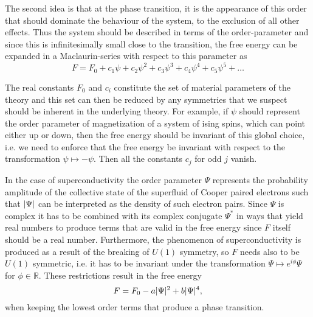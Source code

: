 The second idea is that at the phase transition, it is the appearance of this order that should dominate the behaviour
of the system, to the exclusion of all other effects. Thus the system should be described in terms of the order-parameter
and since this is infinitesimally small close to the transition, the free energy can be expanded in a Maclaurin-series
with respect to this parameter as
\begin{equation}
    \label{eq:statMech:LandauMaclaurin}
    F = F_0 + c_1 \psi + c_2 \psi^2 + c_3 \psi^3 + c_4 \psi^4 + c_5 \psi^5 + \ldots
\end{equation}

The real constants $F_0$ and $c_i$ constitute the set of material parameters of the theory and this set can then
be reduced by any symmetries that we suspect should be inherent in the underlying theory. For example, if $\psi$
should represent the order parameter of magnetization of a system of ising spins, which can point either up or
down, then the free energy should be invariant of this global choice, i.e. we need to enforce that the free energy
be invariant with respect to the transformation $\psi \mapsto -\psi$. Then all the constants $c_j$ for odd $j$
vanish.

In the case of superconductivity the order parameter $\Psi$ represents the probability amplitude of the collective
state of the superfluid of Cooper paired electrons such that $\lvert \Psi \rvert$ can be interpreted as the density of such
electron pairs. Since $\Psi$ is complex it has to be combined with its complex conjugate $\Psi^\ast$ in ways that
yield real numbers to produce terms that are valid in the free energy since $F$ itself should be a real number.
Furthermore, the phenomenon of superconductivity is produced as a result of the breaking of $U(1)$ symmetry, so $F$
needs also to be $U(1)$ symmetric, i.e. it has to be invariant under the transformation $\Psi \mapsto e^{i\phi}\Psi$
for $\phi\in\mathbb{R}$. These restrictions result in the free energy
\begin{equation}
    \label{eq:statMech:LandauU1}
    F = F_0 - a\lvert \Psi \rvert^2 + b\lvert \Psi \rvert^4,
\end{equation}
when keeping the lowest order terms that produce a phase transition.

